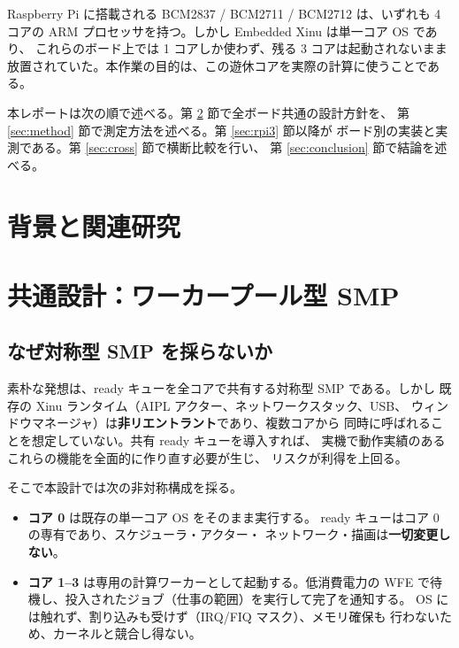 \documentclass[11pt,a4paper]{article}
\begin{document}
Raspberry Pi に搭載される BCM2837 / BCM2711 / BCM2712 は、いずれも 4 コアの
ARM プロセッサを持つ。しかし Embedded Xinu は単一コア OS であり、
これらのボード上では 1 コアしか使わず、残る 3 コアは起動されないまま
放置されていた。本作業の目的は、この遊休コアを実際の計算に使うことである。

本レポートは次の順で述べる。第 \ref{sec:design} 節で全ボード共通の設計方針を、
第 \ref{sec:method} 節で測定方法を述べる。第 \ref{sec:rpi3} 節以降が
ボード別の実装と実測である。第 \ref{sec:cross} 節で横断比較を行い、
第 \ref{sec:conclusion} 節で結論を述べる。

\section{背景と関連研究}
\label{sec:related}


\section{共通設計：ワーカープール型 SMP}
\label{sec:design}

\subsection{なぜ対称型 SMP を採らないか}

素朴な発想は、ready キューを全コアで共有する対称型 SMP である。しかし
既存の Xinu ランタイム（AIPL アクター、ネットワークスタック、USB、
ウィンドウマネージャ）は\textbf{非リエントラント}であり、複数コアから
同時に呼ばれることを想定していない。共有 ready キューを導入すれば、
実機で動作実績のあるこれらの機能を全面的に作り直す必要が生じ、
リスクが利得を上回る。

そこで本設計では次の非対称構成を採る。

\begin{itemize}[leftmargin=1.4em]
  \item \textbf{コア 0} は既存の単一コア OS をそのまま実行する。
        ready キューはコア 0 の専有であり、スケジューラ・アクター・
        ネットワーク・描画は\textbf{一切変更しない}。
  \item \textbf{コア 1--3} は専用の計算ワーカーとして起動する。低消費電力の
        WFE で待機し、投入されたジョブ（仕事の範囲）を実行して完了を通知する。
        OS には触れず、割り込みも受けず（IRQ/FIQ マスク）、メモリ確保も
        行わないため、カーネルと競合し得ない。
\end{itemize}
\end{document}
